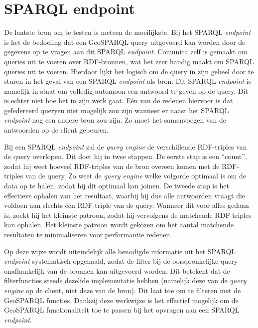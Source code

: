 \section{SPARQL endpoint}
\label{sec:impl_sparql_endpoint}
De laatste bron om te testen is meteen de moeilijkste. Bij het SPARQL \textit{endpoint} is het de bedoeling dat een GeoSPARQL query uitgevoerd kan worden door de gegevens op te vragen aan dit SPARQL \textit{endpoint}. Comunica zelf is gemaakt om queries uit te voeren over RDF-bronnen, wat het zeer handig maakt om SPARQL queries uit te voeren. Hierdoor lijkt het logisch om de query in zijn geheel door te sturen in het geval van een SPARQL \textit{endpoint} als bron. Dit SPARQL \textit{endpoint} is namelijk in staat om volledig automoon een antwoord te geven op de query. Dit is echter niet hoe het in zijn werk gaat. Eén van de redenen hiervoor is dat gefedereerd queryen niet mogelijk zou zijn wanneer er naast het SPARQL \textit{endpoint} nog een andere bron zou zijn. Zo moet het samenvoegen van de antwoorden op de client gebeuren. 

Bij een SPARQL \textit{endpoint} zal de \textit{query engine} de verschillende RDF-triples van de query overlopen. Dit doet hij in twee stappen. De eerste stap is een ``count'', zodat hij weet hoeveel RDF-triples van de bron overeen komen met de RDF-triples van de query. Zo weet de \textit{query engine} welke volgorde optimaal is om de data op te halen, zodat hij dit optimaal kan joinen. De tweede stap is het effectieve ophalen van het resultaat, waarbij hij dus alle antwoorden vraagt die voldoen aan slechts één RDF-triple van de query. Wanneer dit voor alles gedaan is, zoekt hij het kleinste patroon, zodat hij vervolgens de matchende RDF-triples kan ophalen. Het kleinste patroon wordt gekozen om het aantal matchende resultaten te minimaliseren voor performantie redenen.

Op deze wijze wordt uiteindelijk alle benodigde informatie uit het SPARQL \textit{endpoint} systematisch opgehaald, zodat de filter bij de oorspronkelijke query onafhankelijk van de bronnen kan uitgevoerd worden. Dit betekent dat de filterfuncties steeds dezelfde implementatie hebben (namelijk deze van de \textit{query engine} op de client, niet deze van de bron). Dit laat toe om te filteren met de GeoSPARQL functies. Dankzij deze werkwijze is het effectief mogelijk om de GeoSPARQL functionaliteit toe te passen bij het opvragen aan een SPARQL \textit{endpoint}.